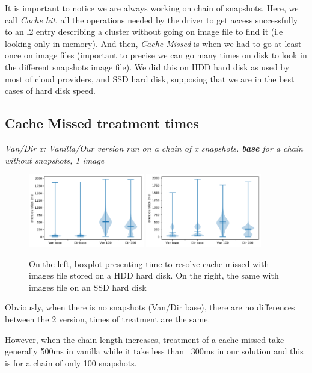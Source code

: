 \documentclass[sigplan,screen,10pt]{acmart}
\begin{document}
	It is important to notice we are always working on chain of snapshots. Here, we call \textit{Cache hit}, all the operations needed by the driver to get access successfully to an l2 entry describing a cluster without going on image file to find it (i.e looking only in memory). And then, \textit{Cache Missed} is when we had to go at least once on image files (important to precise we can go many times on disk to look in the different snapshots image file). We did this on HDD hard disk as used by most of cloud providers, and SSD hard disk, supposing that we are in the best cases of hard disk speed.
	
	\subsection*{Cache Missed treatment times}
	
	\textit{Van/Dir x: Vanilla/Our version run on a chain of x snapshots. \textbf{base} for a chain without snapshots, 1 image}
	\begin{figure}[h]
		\center
		\includegraphics[width=0.45\textwidth]{MISSED_time_hdd.pdf}
		\includegraphics[width=0.45\textwidth]{MISSED_time_ssd.pdf}
		\caption{On the left, boxplot presenting time to resolve cache missed with images file stored on a HDD hard disk. On the right, the same with images file on an SSD hard disk}
		\label{fig:fig-a}
	\end{figure}

	Obviously, when there is no snapshots (Van/Dir base), there are no differences between the 2 version, times of treatment are the same.
	
	However, when the chain length increases, treatment of a cache missed take generally 500ms in vanilla while it take less than ~300ms in our solution and this is for a chain of only 100 snapshots.
	
\end{document}
